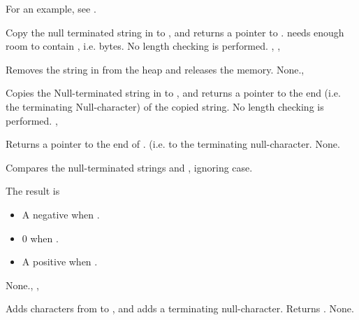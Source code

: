 For an example, see .

{ 
Copy the null terminated string in  to , and
returns a pointer to .  needs enough room to contain
, i.e.  bytes.
}
{No length checking is performed.}{ , , }

\html{}

{
Removes the string in  from the heap and releases the memory.
}
{None.}{, }

\html{}

{
Copies the Null-terminated string in  to , and
returns a pointer to the end (i.e. the terminating Null-character) of the
copied string.
}
{No length checking is performed.}
{, }

\html{}

{
Returns a pointer to the end of . (i.e. to the terminating
null-character.
}
{None.}{}

\html{}

{
Compares the null-terminated strings  and , ignoring case.

The result is 
\begin{itemize}
\item A negative  when .
\item 0 when .
\item A positive  when .
\end{itemize}
}
{None.}{, , }

\html{}

{
Adds  characters from  to , and adds a
terminating null-character. Returns .
}
{None.}{}

